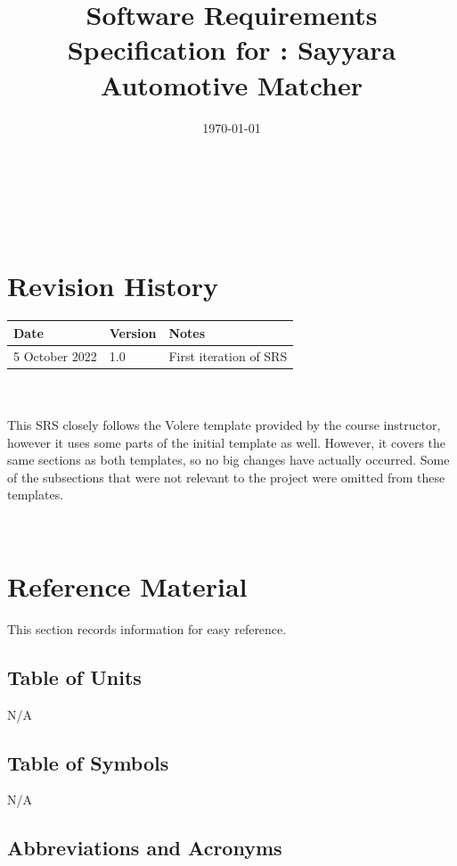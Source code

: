 \documentclass[12pt]{article}
\begin{document}
\title{Software Requirements Specification for \progname: Sayyara Automotive Matcher} 
\author{\authname}
\date{\today}
	
\maketitle

~\newpage


\tableofcontents

~\newpage

\section*{Revision History}

\begin{tabularx}{\textwidth}{p{3cm}p{2cm}X}
\toprule {\bf Date} & {\bf Version} & {\bf Notes}\\
\midrule
5 October 2022 & 1.0 & First iteration of SRS\\
\bottomrule
\end{tabularx}
\\\\
This SRS closely follows the Volere template provided by the course instructor, however it uses some parts of the initial template as well. However, it covers the same sections as both templates, so no big changes have actually occurred. Some of the subsections that were not relevant to the project were omitted from these templates.

~\newpage

\section{Reference Material}

This section records information for easy reference.

\subsection{Table of Units}

N/A

\subsection{Table of Symbols}

N/A

\subsection{Abbreviations and Acronyms}
\end{document}

